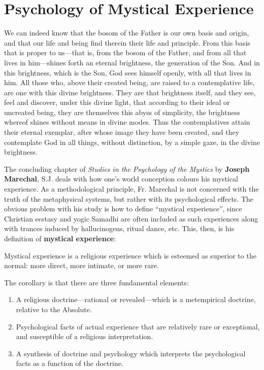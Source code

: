 \section{Psychology of Mystical Experience}

\begin{quotex}
We can indeed know that the bosom of the Father is our own basis and origin, and that our life and being find therein their life and principle. From this basis that is proper to us---that is, from the bosom of the Father, and from all that lives in him---shines forth an eternal brightness, the generation of the Son. And in this brightness, which is the Son, God sees himself openly, with all that lives in him. All those who, above their created being, are raised to a contemplative life, are one with this divine brightness. They are that brightness itself, and they see, feel and discover, under this divine light, that according to their ideal or uncreated being, they are themselves this abyss of simplicity, the brightness whereof shines without means in divine modes. Thus the contemplatives attain their eternal exemplar, after whose image they have been created, and they contemplate God in all things, without distinction, by a simple gaze, in the divine brightness.
\end{quotex}


The concluding chapter of \emph{Studies in the Psychology of the Mystics} by \textbf{Joseph Marechal}, S.J. deals with how one's world conception colours his mystical experience. As a methodological principle, Fr. Marechal is not concerned with the truth of the metaphysical systems, but rather with its psychological effects. The obvious problem with his study is how to define ``mystical experience'', since Christian ecstasy and yogic Samadhi are often included as such experiences along with trances induced by hallucinogens, ritual dance, etc. This, then, is his definition of \textbf{mystical experience}:

\begin{quotex}
Mystical experience is a religious experience which is esteemed as superior to the normal: more direct, more intimate, or more rare.
\end{quotex}


The corollary is that there are three fundamental elements:

\begin{enumerate}


\item A religious doctrine---rational or revealed---which is a metempirical doctrine, relative to the Absolute.

\item Psychological facts of actual experience that are relatively rare or exceptional, and susceptible of a religious interpretation.

\item A synthesis of doctrine and psychology which interprets the psychological facts as a function of the doctrine.
\end{enumerate}


